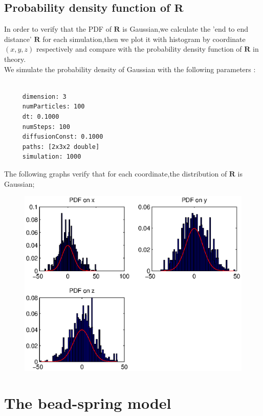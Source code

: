\documentclass{article}
\begin{document}
\subsection{Probability density function of $\bm{R}$  }
In order to verify that the PDF of $\bm{R}$ is Gaussian,we calculate the 'end to end distance' $\bm{R}$ for each simulation,then we plot it with histogram by coordinate $(x,y,z)$ respectively and compare with the probability density function of $\bm{R}$ in theory. \\
We simulate the probability density of Gaussian  with the following parameters :
\begin{lstlisting}

     dimension: 3
     numParticles: 100
     dt: 0.1000
     numSteps: 100
     diffusionConst: 0.1000
     paths: [2x3x2 double]
     simulation: 1000

\end{lstlisting}
The following graphs verify that for each coordinate,the distribution of $\bm{R}$ is Gaussian;
\begin{figure}[H]
	\includegraphics[width=6.2in]{PDF.eps} 
	 
	 \end{figure}
	 \section{The bead-spring model}
\end{document}
